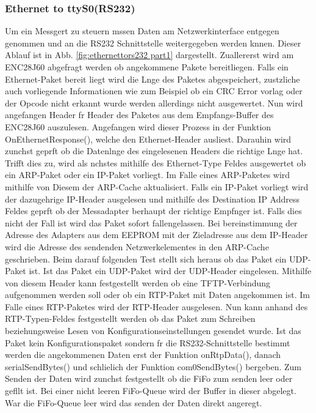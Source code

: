 \documentclass[a4paper]{book}%
\begin{document}
\subsubsection{Ethernet to ttyS0(RS232)}
Um ein Messgert zu steuern mssen Daten am Netzwerkinterface entgegen genommen und an die RS232 Schnittstelle weitergegeben werden knnen. Dieser Ablauf ist in Abb. \ref{fig:ethernettors232 part1} dargestellt. Zuallererst wird am ENC28J60 abgefragt werden ob angekommene Pakete bereitliegen. Falls ein Ethernet-Paket bereit liegt wird die Lnge des Paketes abgespeichert, zustzliche auch vorliegende Informationen wie zum Beispiel ob ein CRC Error vorlag oder der Opcode nicht erkannt wurde werden allerdings nicht ausgewertet. Nun wird angefangen Header fr Header des Paketes aus dem Empfangs-Buffer des ENC28J60 auszulesen. Angefangen wird dieser Prozess in der Funktion OnEthernetResponse(), welche den Ethernet-Header ausliest. Darauhin wird zunchst geprft ob die Datenlnge des eingelesenen Headers die richtige Lnge hat. Trifft dies zu, wird als nchstes mithilfe des Ethernet-Type Feldes ausgewertet ob ein ARP-Paket oder ein IP-Paket vorliegt. Im Falle eines ARP-Paketes wird mithilfe von Diesem der ARP-Cache aktualisiert. Falls ein  IP-Paket vorliegt wird der dazugehrige IP-Header ausgelesen und mithilfe des Destination IP Address Feldes geprft ob der Messadapter berhaupt der richtige Empfnger ist. Falls dies nicht der Fall ist wird das Paket sofort fallengelassen. Bei bereinstimmung der Adresse des Adapters aus dem EEPROM mit der Zieladresse aus dem IP-Header wird die Adresse des sendenden Netzwerkelementes in den ARP-Cache geschrieben. Beim darauf folgenden Test stellt sich heraus ob das Paket ein UDP-Paket ist. Ist das Paket ein UDP-Paket wird der UDP-Header eingelesen. Mithilfe von diesem Header kann festgestellt werden ob eine TFTP-Verbindung aufgenommen werden soll oder ob ein RTP-Paket mit Daten angekommen ist. Im Falle eines RTP-Paketes wird der RTP-Header ausgelesen. Nun kann anhand des RTP-Typen-Feldes festgestellt werden ob das Paket zum Schreiben beziehungsweise Lesen von Konfigurationseinstellungen gesendet wurde. Ist das Paket kein Konfigurationspaket sondern fr die RS232-Schnittstelle bestimmt werden die angekommenen Daten erst der Funktion onRtpData(), danach serialSendBytes() und schlielich der Funktion com0SendBytes() bergeben. Zum Senden der Daten wird zunchst festgestellt ob die FiFo zum senden leer oder gefllt ist. Bei einer nicht leeren FiFo-Queue wird der Buffer in dieser abgelegt. War die FiFo-Queue leer wird das senden der Daten direkt angeregt.
\end{document}
